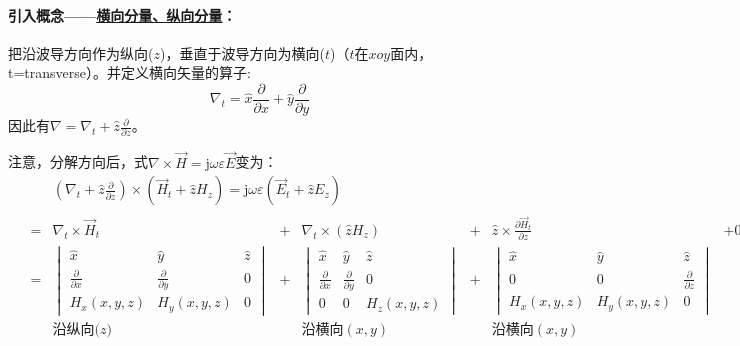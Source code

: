     \paragraph{引入概念——\underline{横向分量、纵向分量}：}把沿波导方向作为纵向($z$)，垂直于波导方向为横向($t$)（$t$在$xoy$面内，t=transverse）。并定义横向矢量的算子:
    \begin{equation*}
        \nabla_t=\hat{x}\frac{\partial }{\partial x}+\hat{y}\frac{\partial }{\partial y}
    \end{equation*}
    因此有$\nabla=\nabla_t+\hat{z}\frac{\partial }{\partial z}$。

    注意，分解方向后，式$\nabla\times\vec{H}=\mathrm{j}\omega \varepsilon \vec{E}$变为：
    \begin{align*}
        &\qquad \left(\nabla_t+\hat{z}\frac{\partial }{\partial z}\right)\times\left( \vec{H}_{t}+\hat{z}H_{z}\right)=\mathrm{j}\omega \varepsilon\left(\vec{E}_t+\hat{z}E_z\right)\\
        &\begin{array}{ccccccc}
            =&\nabla_t\times \vec{H}_t&+&\nabla_t\times(\hat{z}H_z)&+&\hat{z}\times \frac{\partial \vec{H}_t}{\partial z}&+0\\
            =&\begin{vmatrix}
                \hat{x}&\hat{y}&\hat{z}\\
                \frac{\partial }{\partial x}&\frac{\partial }{\partial y}&0\\
                H_x(x,y,z)&H_y(x,y,z)&0
            \end{vmatrix}&+
            &\begin{vmatrix}
                \hat{x}&\hat{y}&\hat{z}\\
                \frac{\partial }{\partial x}&\frac{\partial }{\partial y}&0\\
                0&0&H_z(x,y,z)
            \end{vmatrix}&+
            &\begin{vmatrix}
                \hat{x}&\hat{y}&\hat{z}\\
                0&0&\frac{\partial }{\partial z}\\
                H_x(x,y,z)&H_y(x,y,z)&0
            \end{vmatrix}&\\
            &\mbox{沿纵向($z$)}&&\mbox{沿横向$(x,y)$}&&\mbox{沿横向$(x,y)$}&
        \end{array}
    \end{align*}

